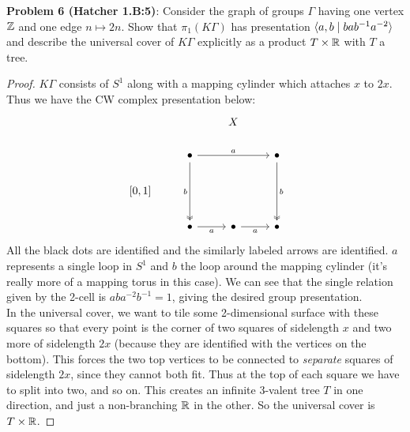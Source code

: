 \documentclass{amsart}
\begin{document}
\newpage
\textbf{Problem 6 (Hatcher 1.B:5)}: Consider the graph of groups $\Gamma$ having one vertex $\mathbb{Z}$ and one edge $n\mapsto 2n$. Show that $\pi_1(K\Gamma)$ has presentation $\langle a,b\;|\;bab^{-1}a^{-2}\rangle$ and describe the universal cover of $K\Gamma$ explicitly as a product $T\times \mathbb{R}$ with $T$ a tree.
\begin{proof}
	$K\Gamma$ consists of $S^1$ along with a mapping cylinder which attaches $x$ to $2x$. Thus we have the CW complex presentation below:
	$$
	\begin{tikzcd}
		&& X \\
		& \bullet && \bullet \\
		{[0,1]} \\
		& \bullet & \bullet & \bullet
		\arrow["a", from=2-2, to=2-4]
		\arrow["b"', two heads, from=2-2, to=4-2]
		\arrow["b", two heads, from=2-4, to=4-4]
		\arrow["a"', from=4-2, to=4-3]
		\arrow["a"', from=4-3, to=4-4]
	\end{tikzcd}
	$$
	All the black dots are identified and the similarly labeled arrows are identified. $a$ represents a single loop in $S^1$ and $b$ the loop around the mapping cylinder (it's really more of a mapping torus in this case). We can see that the single relation given by the 2-cell is $aba^{-2}b^{-1}=1$, giving the desired group presentation.\\

	In the universal cover, we want to tile some 2-dimensional surface with these squares so that every point is the corner of two squares of sidelength $x$ and two more of sidelength $2x$ (because they are identified with the vertices on the bottom). This forces the two top vertices to be connected to \textit{separate} squares of sidelength $2x$, since they cannot both fit. Thus at the top of each square we have to split into two, and so on. This creates an infinite 3-valent tree $T$ in one direction, and just a non-branching $\mathbb{R}$ in the other. So the universal cover is $T\times \mathbb{R}$.
	

\end{proof}
\end{document}
